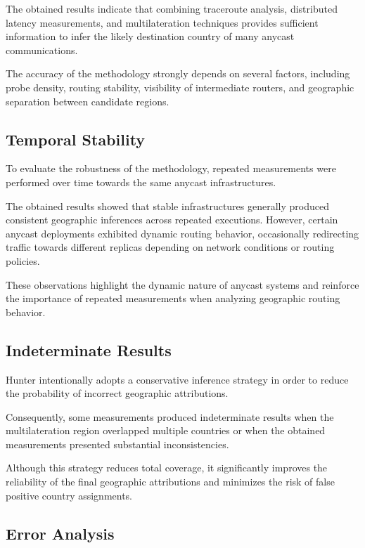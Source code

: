 The obtained results indicate that combining traceroute analysis, distributed latency measurements, and multilateration techniques provides sufficient information to infer the likely destination country of many anycast communications.

The accuracy of the methodology strongly depends on several factors, including probe density, routing stability, visibility of intermediate routers, and geographic separation between candidate regions.

\subsection{Temporal Stability}

To evaluate the robustness of the methodology, repeated measurements were performed over time towards the same anycast infrastructures.

The obtained results showed that stable infrastructures generally produced consistent geographic inferences across repeated executions. However, certain anycast deployments exhibited dynamic routing behavior, occasionally redirecting traffic towards different replicas depending on network conditions or routing policies.

These observations highlight the dynamic nature of anycast systems and reinforce the importance of repeated measurements when analyzing geographic routing behavior.

\subsection{Indeterminate Results}

Hunter intentionally adopts a conservative inference strategy in order to reduce the probability of incorrect geographic attributions.

Consequently, some measurements produced indeterminate results when the multilateration region overlapped multiple countries or when the obtained measurements presented substantial inconsistencies.

Although this strategy reduces total coverage, it significantly improves the reliability of the final geographic attributions and minimizes the risk of false positive country assignments.

\subsection{Error Analysis}

